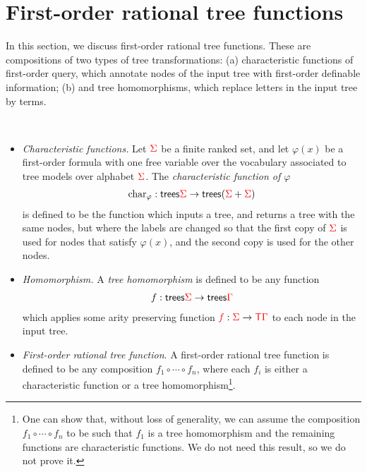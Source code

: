 \section{First-order rational tree functions}\label{sec:fo-translation}
In this section, we discuss first-order rational tree functions. These are compositions of two types of tree transformations: (a) characteristic functions of first-order query, which annotate nodes of the input tree with first-order definable information; (b) and tree homomorphisms, which replace letters in the input tree  by terms. 


\begin{definition} \label{def:forat}\ 
    \begin{itemize}
        \item \emph{Characteristic functions.}  Let ${\color{red}{\Sigma}}$ be a finite ranked set, and let $\varphi(x)$ be a first-order formula with one free variable over the vocabulary associated to tree models over alphabet ${\color{red}{\Sigma}}$. The \emph{characteristic function of $\varphi$} 
        \begin{align*}
            \mathrm{char}_\varphi : \mathsf {trees} {\color{red}{\Sigma}} \to \mathsf {trees} ({\color{red}{\Sigma}} + {\color{red}{\Sigma}})
        \end{align*}
        is defined to be the function which inputs a tree, and returns a tree with the same nodes, but where the labels are changed so that the first copy of ${\color{red}{\Sigma}}$ is used for nodes that satisfy  $\varphi(x)$, and the second copy is used for the other nodes.
        \item \emph{Homomorphism.} A \emph{tree homomorphism} is defined to be any function
        \begin{align*}
            f : \mathsf {trees} {\color{red}{\Sigma}} \to \mathsf {trees} {\color{red}{\Gamma}}
        \end{align*} 
        which applies some arity preserving function ${\color{red}{f}} : {\color{red}{\Sigma}} \to {\color{red}{\mathsf T}} {\color{red}{\Gamma}}$ to each node in the input tree. 
        \item \emph{First-order rational tree function}. A first-order rational tree function is defined to be any composition $f_1 \circ \cdots \circ f_n$, where each $f_i$ is either a characteristic function or a tree homomorphism\footnote{One can show that, without loss of generality, we can assume the composition $f_1 \circ \cdots \circ f_n$ to be such that $f_1$ is a tree homomorphism and the remaining functions are  characteristic functions. We do not need this result, so we do not prove it.
        }.
    \end{itemize}
      \end{definition}

